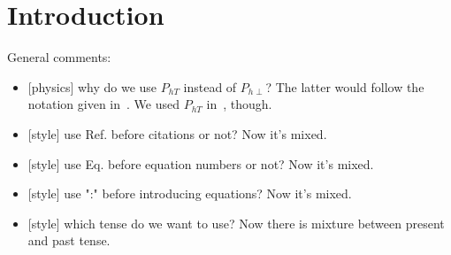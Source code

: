 \documentclass[aps,preprintnumbers,showpacs,nofootinbib,superscriptaddress,floatfix]{revtex4}
\newcommand{\AS}[1]{{\textcolor[rgb]{1,0,1}{#1}}}
\begin{document}

\maketitle
\tableofcontents

\newpage
\section{Introduction}
\label{s:intro}

\AS{General comments:}
\begin{itemize}
\item \AS{[physics] why do we use $P_{hT}$ instead of $P_{h\perp}$? The latter would follow the notation given in~\cite{Mulders:1995dh,Bacchetta:2006tn,Bacchetta:2004jz}. We used $P_{hT}$ in~\cite{Signori:2013mda}, though.}
\item \AS{[style] use Ref. before citations or not? Now it's mixed.}
\item \AS{[style] use Eq. before equation numbers or not? Now it's mixed.}
\item \AS{[style] use ":" before introducing equations? Now it's mixed.}
\item \AS{[style] which tense do we want to use? Now there is mixture between present and past tense.}
\end{itemize}
\end{document}
